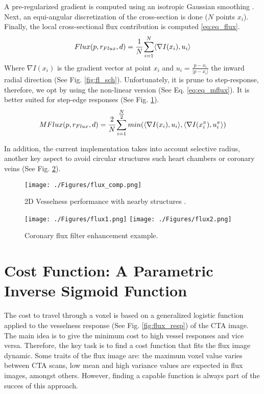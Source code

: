 A pre-regularized gradient is computed using an isotropic Gaussian smoothing \citep{Deriche1993}. Next, an  equi-angular discretization of the cross-section is done ($N$ points $x_i$). Finally, the local cross-sectional flux contribution is computed \ref{eq:eq_flux}.
\begin{equation}
\label{eq:eq_flux}
Flux( p, r_{Flux}, d) = \cfrac{1}{N} \sum\limits_{i=1}^N \langle \nabla I(x_{i}),u_{i} \rangle 
\end{equation}
Where $\nabla I(x_{i})$ is the gradient vector at point $x_i$ and $u_{i}=\tfrac{p-x_i}{\vert p-x_i\vert} $ the inward radial direction (See Fig. \ref{fig:fl_sch}). Unfortunately, it is prune to step-response, therefore, we opt by using the non-linear version (See Eq. \ref{eq:eq_mflux}). It is better suited for step-edge responses (See Fig. \ref{fig:fl_comp}).
\begin{equation}
\label{eq:eq_mflux}
MFlux( p, r_{Flux}, d) = \cfrac{2}{N} \sum\limits_{i=1}^{\tfrac{N}{2}} min(\langle \nabla I(x_{i}),u_{i} \rangle,\langle \nabla I(x_{i}^{\pi}),u_{i}^{\pi} \rangle )
\end{equation}

In addition, the current implementation takes into account selective radius, another key aspect to avoid circular structures such heart chambers or coronary veins (See Fig. \ref{fig:fl1_vs_fl2}).
\begin{figure}[ht]
	\centering
		\texttt{[image: ./Figures/flux\_comp.png]}
	\caption[Vesselness Comparison]{2D Vesselness performance with nearby structures \citep{Lesage2009Thesis}.}
	\label{fig:fl_comp}
\end{figure}

\begin{figure}[ht]
	\centering
		\texttt{[image: ./Figures/flux1.png]}
		\texttt{[image: ./Figures/flux2.png]}
	\caption[Coronary Flux Filter Enhancement]{Coronary flux filter enhancement example.}
	\label{fig:fl1_vs_fl2}
\end{figure}

\section{Cost Function: A Parametric Inverse Sigmoid Function}\label{cent:cost}

The cost to travel through a voxel is based on a generalized logistic function applied to the vesselness response (See Fig. \ref{fig:flux_resp}) of the CTA image. The main idea is to give the minimum cost to high vessel responses and vice versa. Therefore, the key task is to find a cost function that fits the flux image dynamic. Some traits of the flux image are: the maximum voxel value varies between CTA scans, low mean and high variance values are expected in flux images, amongst others. However, finding a capable function is always part of the succes of this approach.

